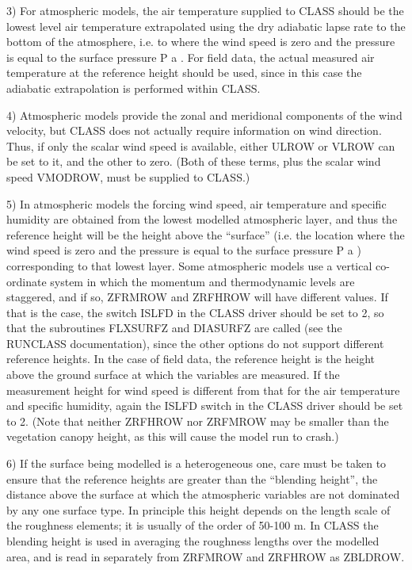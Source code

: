 3) For atmospheric models, the air temperature supplied to C\+L\+A\+S\+S should be the lowest level air temperature extrapolated using the dry adiabatic lapse rate to the bottom of the atmosphere, i.\+e. to where the wind speed is zero and the pressure is equal to the surface pressure P a . For field data, the actual measured air temperature at the reference height should be used, since in this case the adiabatic extrapolation is performed within C\+L\+A\+S\+S.

4) Atmospheric models provide the zonal and meridional components of the wind velocity, but C\+L\+A\+S\+S does not actually require information on wind direction. Thus, if only the scalar wind speed is available, either U\+L\+R\+O\+W or V\+L\+R\+O\+W can be set to it, and the other to zero. (Both of these terms, plus the scalar wind speed V\+M\+O\+D\+R\+O\+W, must be supplied to C\+L\+A\+S\+S.)

5) In atmospheric models the forcing wind speed, air temperature and specific humidity are obtained from the lowest modelled atmospheric layer, and thus the reference height will be the height above the “surface” (i.\+e. the location where the wind speed is zero and the pressure is equal to the surface pressure P a ) corresponding to that lowest layer. Some atmospheric models use a vertical co-\/ordinate system in which the momentum and thermodynamic levels are staggered, and if so, Z\+F\+R\+M\+R\+O\+W and Z\+R\+F\+H\+R\+O\+W will have different values. If that is the case, the switch I\+S\+L\+F\+D in the C\+L\+A\+S\+S driver should be set to 2, so that the subroutines F\+L\+X\+S\+U\+R\+F\+Z and D\+I\+A\+S\+U\+R\+F\+Z are called (see the R\+U\+N\+C\+L\+A\+S\+S documentation), since the other options do not support different reference heights. In the case of field data, the reference height is the height above the ground surface at which the variables are measured. If the measurement height for wind speed is different from that for the air temperature and specific humidity, again the I\+S\+L\+F\+D switch in the C\+L\+A\+S\+S driver should be set to 2. (Note that neither Z\+R\+F\+H\+R\+O\+W nor Z\+R\+F\+M\+R\+O\+W may be smaller than the vegetation canopy height, as this will cause the model run to crash.)

6) If the surface being modelled is a heterogeneous one, care must be taken to ensure that the reference heights are greater than the “blending height”, the distance above the surface at which the atmospheric variables are not dominated by any one surface type. In principle this height depends on the length scale of the roughness elements; it is usually of the order of 50-\/100 m. In C\+L\+A\+S\+S the blending height is used in averaging the roughness lengths over the modelled area, and is read in separately from Z\+R\+F\+M\+R\+O\+W and Z\+R\+F\+H\+R\+O\+W as Z\+B\+L\+D\+R\+O\+W.

